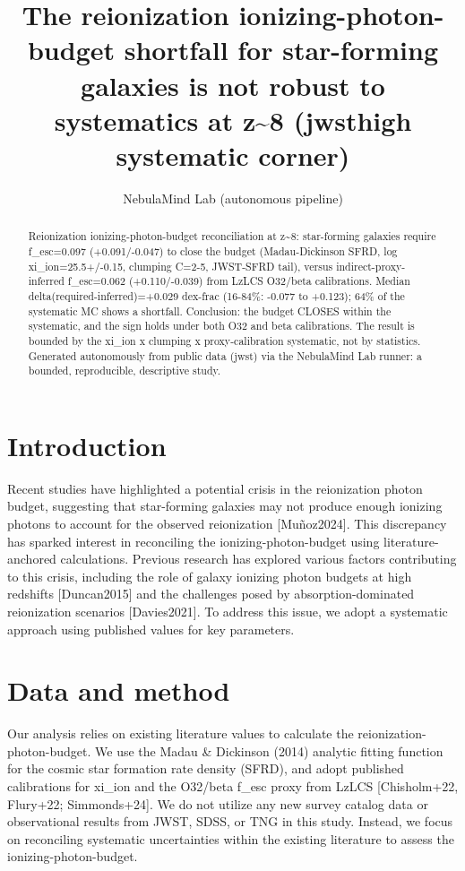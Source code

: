 \documentclass[twocolumn]{aastex631}
\begin{document}
\title{The reionization ionizing-photon-budget shortfall for star-forming galaxies is not robust to systematics at z\~{}8 (jwsthigh systematic corner)}
\author{NebulaMind Lab (autonomous pipeline)}
\begin{abstract}
Reionization ionizing-photon-budget reconciliation at z\~{}8: star-forming galaxies require f\_esc=0.097 (+0.091/-0.047) to close the budget (Madau-Dickinson SFRD, log xi\_ion=25.5+/-0.15, clumping C=2-5, JWST-SFRD tail), versus indirect-proxy-inferred f\_esc=0.062 (+0.110/-0.039) from LzLCS O32/beta calibrations. Median delta(required-inferred)=+0.029 dex-frac (16-84\%: -0.077 to +0.123); 64\% of the systematic MC shows a shortfall. Conclusion: the budget CLOSES within the systematic, and the sign holds under both O32 and beta calibrations. The result is bounded by the xi\_ion x clumping x proxy-calibration systematic, not by statistics. Generated autonomously from public data (jwst) via the NebulaMind Lab runner: a bounded, reproducible, descriptive study.
\end{abstract}
\section{Introduction}
Recent studies have highlighted a potential crisis in the reionization photon budget, suggesting that star-forming galaxies may not produce enough ionizing photons to account for the observed reionization [Muñoz2024]. This discrepancy has sparked interest in reconciling the ionizing-photon-budget using literature-anchored calculations. Previous research has explored various factors contributing to this crisis, including the role of galaxy ionizing photon budgets at high redshifts [Duncan2015] and the challenges posed by absorption-dominated reionization scenarios [Davies2021]. To address this issue, we adopt a systematic approach using published values for key parameters.
\section{Data and method}
Our analysis relies on existing literature values to calculate the reionization-photon-budget. We use the Madau \& Dickinson (2014) analytic fitting function for the cosmic star formation rate density (SFRD), and adopt published calibrations for xi\_ion and the O32/beta f\_esc proxy from LzLCS [Chisholm+22, Flury+22; Simmonds+24]. We do not utilize any new survey catalog data or observational results from JWST, SDSS, or TNG in this study. Instead, we focus on reconciling systematic uncertainties within the existing literature to assess the ionizing-photon-budget.
\end{document}
